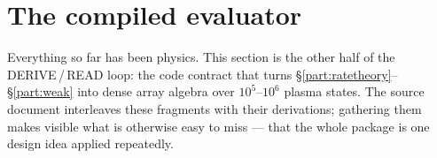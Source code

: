 %

\section{The compiled evaluator}
\label{part:evaluator}

Everything so far has been physics. This section is the other half of the
DERIVE\,/\,READ loop: the code contract that turns
\S\ref{part:ratetheory}--\S\ref{part:weak} into dense array algebra over
$10^5$--$10^6$ plasma states. The source document interleaves these fragments
with their derivations; gathering them makes visible what is otherwise easy to
miss --- that the whole  package is one design idea applied
repeatedly.

